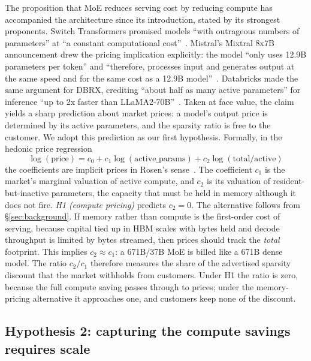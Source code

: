 \documentclass[11pt]{article}
\begin{document}
The proposition that MoE reduces serving cost by reducing compute has
accompanied the architecture since its introduction, stated by its strongest
proponents. Switch Transformers promised models ``with outrageous numbers of parameters'' at ``a constant computational cost''~\cite{r30}. Mistral's
Mixtral 8x7B announcement drew the pricing implication explicitly: the model
``only uses 12.9B parameters per token'' and ``therefore, processes input and
generates output at the same speed and for the same cost as a 12.9B
model''~\cite{r31}. Databricks made the same argument for DBRX, crediting
``about half as many active parameters'' for inference ``up to 2x faster than
LLaMA2-70B''~\cite{r32}. Taken at face value, the claim yields a sharp
prediction about market prices: a model's output price is determined by its
active parameters, and the sparsity ratio is free to the customer. We adopt
this prediction as our first hypothesis. Formally, in the hedonic price
regression
\begin{equation}
\log(\text{price}) = c_0 + c_1 \log(\text{active\_params})
                        + c_2 \log(\text{total}/\text{active})
\label{eq:hedonic}
\end{equation}
the coefficients are implicit prices in Rosen's sense~\cite{r27}. The coefficient $c_1$ is the market's marginal valuation of active compute, and $c_2$ is its valuation of resident-but-inactive parameters, the capacity that must be held in memory although it does not fire. \emph{H1 (compute pricing)} predicts $c_2 = 0$. The
alternative follows from \S\ref{sec:background}. If memory rather than compute is the first-order cost of serving, because capital tied up in HBM scales with bytes held and decode throughput is limited by bytes streamed, then prices should track the \emph{total} footprint. This implies $c_2 \approx c_1$: a 671B/37B MoE is billed like a 671B dense model. The ratio $c_2/c_1$ therefore measures the
share of the advertised sparsity discount that the market withholds from
customers. Under H1 the ratio is zero, because the full compute saving
passes through to prices; under the memory-pricing alternative it approaches
one, and customers keep none of the discount.

\subsection{Hypothesis 2: capturing the compute savings requires scale}
\label{sec:h2}
\end{document}
